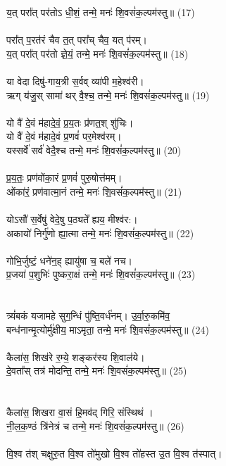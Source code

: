 य॒त् परा᳚त् पर॑तोऽ धी॒शं॒ तन्मे॒ मनः॑ शि॒वसं॑क॒ल्पम॑स्तु॥ (17)\\
\\
परा᳚त् प॒रत॑रं चैव त॒त् परा᳚च् चैव॒ यत् प॑रम्। \\
य॒त् परा᳚त् पर॑तो ज्ञे॒यं॒ तन्मे॒ मनः॑ शि॒वसं॑क॒ल्पम॑स्तु॥ (18)\\
\\
या वेदा दिषु॑-गाय॒त्री स॒र्वव् व्या॑पी म॒हेश्व॑री। \\
ऋग् य॑जु॒स् सामा॑ थर् वै॒श्च॒ तन्मे॒ मनः॑ शि॒वसं॑क॒ल्पम॑स्तु॥ (19)\\
\\
यो वै॑ दे॒वं म॑हादे॒वं॒ प्र॒य॒तः प्र॑णत॒श् शु॑चिः। \\
{\small यो वै॑ दे॒वं म॑हादे॒वं प्र॒णवं॑ पर॒मेश्व॑रम्।}\\
यस्सर्वे॑ सर्व॑ वेदै॒श्च तन्मे॒ मनः॑ शि॒वसं॑क॒ल्पम॑स्तु॥ (20)\\
\\
प्र॒य॒तः॒ प्रण॑वोंका॒रं प्र॒णवं॑ पुरु॒षोत्त॑मम्। \\
ओंका॑रं॒ प्रण॑वात्मा॒नं तन्मे॒ मनः॑ शि॒वसं॑क॒ल्पम॑स्तु॥ (21)\\
\\
योऽसौ॑ स॒र्वेषु॑ वेदे॒षु प॒ठ्यते᳚ ह्यय॒ मीश्व॑र:। \\
अकायो॑ निर्गु॑णो ह्या॒त्मा तन्मे॒ मनः॑ शि॒वसं॑क॒ल्पम॑स्तु॥ (22)\\
\\
गोभि॒र्जुष्टं॒ धने॑न॒ह् ह्यायु॑षा च॒ बले॑ नच। \\
प्र॒जया॑ प॒शुभिः॑ पुष्करा॒क्षं तन्मे॒ मनः॑ शि॒वसं॑क॒ल्पम॑स्तु॥ (23)\\
\\
{\small {}}\\
त्र्यं॑बकं यजामहे सुग॒न्धिं पु॑ष्ति॒वर्ध॑नम्। उ॒र्वा॒रु॒कमि॑व॒ \\
बन्ध॑नान्मृ॒त्योर्मु॑क्षीय॒ माऽमृता॒ तन्मे॒ मनः॑ शि॒वसं॑क॒ल्पम॑स्तु॥ (24)\\
\\
कैला॑स॒ शिख॑रे र॒म्ये॒ शङ्कर॑स्य शि॒वाल॑ये। \\
दे॒वता᳚स् तत्र॑ मोदन्ति॒ तन्मे॒ मनः॑ शि॒वसं॑क॒ल्पम॑स्तु॥ (25)\\
\\
{\small {}}\\
कैला॑स॒ शिखरा वा॒सं हि॒मव॑द् गिरि॒ संस्थिथं । \\
नी॒ल॒क॒ण्ठं त्रि॑नेत्रं च तन्मे॒ मनः॑ शि॒वसं॑क॒ल्पम॑स्तु॥ (26)\\
\\
वि॒श्व त॑श् चक्षुरु॒त वि॒श्व तो॑मुखो वि॒श्व तो॑हस्त उ॒त वि॒श्व त॑स्पात्।\\
